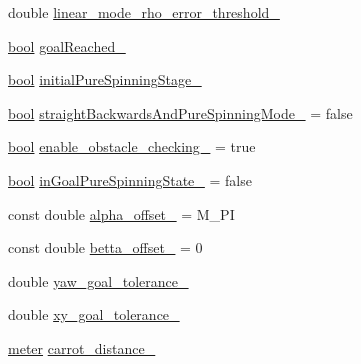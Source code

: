 \begin{DoxyCompactItemize}
\item 
double \hyperlink{classcl__move__base__z_1_1backward__local__planner_1_1BackwardLocalPlanner_a858efacf597a3a35c97aec9ca53e5900}{linear\+\_\+mode\+\_\+rho\+\_\+error\+\_\+threshold\+\_\+}
\item 
\hyperlink{classbool}{bool} \hyperlink{classcl__move__base__z_1_1backward__local__planner_1_1BackwardLocalPlanner_ad443c52ef585a8eab0364f0909222f51}{goal\+Reached\+\_\+}
\item 
\hyperlink{classbool}{bool} \hyperlink{classcl__move__base__z_1_1backward__local__planner_1_1BackwardLocalPlanner_aa0e2b0589fce0bb228eb87751528e822}{initial\+Pure\+Spinning\+Stage\+\_\+}
\item 
\hyperlink{classbool}{bool} \hyperlink{classcl__move__base__z_1_1backward__local__planner_1_1BackwardLocalPlanner_a04febb67563add6f715051a94aed1b9b}{straight\+Backwards\+And\+Pure\+Spinning\+Mode\+\_\+} = false
\item 
\hyperlink{classbool}{bool} \hyperlink{classcl__move__base__z_1_1backward__local__planner_1_1BackwardLocalPlanner_a154043366660cc02ec758dda32817511}{enable\+\_\+obstacle\+\_\+checking\+\_\+} = true
\item 
\hyperlink{classbool}{bool} \hyperlink{classcl__move__base__z_1_1backward__local__planner_1_1BackwardLocalPlanner_ae4d7254afd19ae1f7bd8eac9f5d58b9a}{in\+Goal\+Pure\+Spinning\+State\+\_\+} = false
\item 
const double \hyperlink{classcl__move__base__z_1_1backward__local__planner_1_1BackwardLocalPlanner_a09765b08935d9355447c44776e1b1c3a}{alpha\+\_\+offset\+\_\+} = M\+\_\+\+PI
\item 
const double \hyperlink{classcl__move__base__z_1_1backward__local__planner_1_1BackwardLocalPlanner_a07e5f16f6951cca1e6d3483f345d0bb1}{betta\+\_\+offset\+\_\+} = 0
\item 
double \hyperlink{classcl__move__base__z_1_1backward__local__planner_1_1BackwardLocalPlanner_a9c5104d328041fcde5a3c02664abad48}{yaw\+\_\+goal\+\_\+tolerance\+\_\+}
\item 
double \hyperlink{classcl__move__base__z_1_1backward__local__planner_1_1BackwardLocalPlanner_aa4ec2c87947a3c08f8278eff052e7c8c}{xy\+\_\+goal\+\_\+tolerance\+\_\+}
\item 
\hyperlink{backward__local__planner_8h_ab6024a26b088c11b8a5218a469ae5a57}{meter} \hyperlink{classcl__move__base__z_1_1backward__local__planner_1_1BackwardLocalPlanner_a0bbb80ce5bae865c4322869422803296}{carrot\+\_\+distance\+\_\+}
\item 

\end{DoxyCompactItemize}
